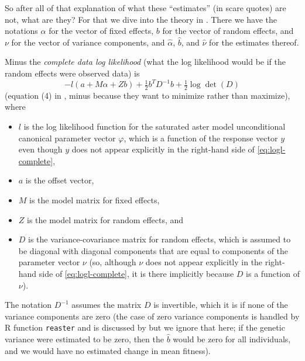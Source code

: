 \documentclass[11pt]{article}
\let\code=\texttt
\begin{document}
So after all of that explanation of what these ``estimates'' (in scare quotes)
are not, what are they?  For that we dive into the theory in
\citet[Section~2]{reaster}.  There we have the notations $\alpha$ for
the vector of fixed effects, $b$ for the vector of random effects,
and $\nu$ for the vector of variance components, and
$\hat{\alpha}$, $\hat{b}$, and $\hat{\nu}$ for the estimates thereof.

Minus the \emph{complete data log likelihood} (what the log likelihood would
be if the random effects were observed data) is
\begin{equation} \label{eq:logl-complete}
   - l(a + M \alpha + Z b) + \tfrac{1}{2} b^T D^{-1} b
   + \tfrac{1}{2} \log \det(D)
\end{equation}
(equation (4) in \citet{reaster}, minus because they want to minimize
rather than maximize), where
\begin{itemize}
\item $l$ is the log likelihood function for the saturated aster model
    unconditional canonical parameter vector $\varphi$,
    which is a function of the response vector $y$ even though $y$
    does not appear explicitly in the right-hand side
    of \eqref{eq:logl-complete},
\item $a$ is the offset vector,
\item $M$ is the model matrix for fixed effects,
\item $Z$ is the model matrix for random effects, and
\item $D$ is the variance-covariance matrix for random effects,
    which is assumed to be diagonal with diagonal components that
    are equal to components of the parameter vector $\nu$ (so,
    although $\nu$ does not appear explicitly in the right-hand side
    of \eqref{eq:logl-complete}, it is there implicitly
    because $D$ is a function of $\nu$).
\end{itemize}
The notation $D^{-1}$ assumes the matrix $D$ is invertible, which it is
if none of the variance components are zero (the case of zero variance
components is handled by R function \code{reaster} and is discussed
by \citet{reaster} but we ignore that here; if the genetic variance
were estimated to be zero, then the $\hat{b}$ would be zero for
all individuals, and we would have no estimated change in mean fitness).
\end{document}
